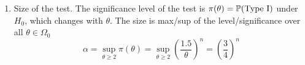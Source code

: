\documentclass[10pt, a4paper]{article}
\begin{document}
\begin{problem}
\begin{solution}
\begin{enumerate}[label = (\alph*)]
            Conversely,
            for $\theta > 1.5$,
            the probability of rejection is $\P(Y_n \leq 1.5) = \left(\frac{1.5}{\theta}\right) ^ n$ so
            \[
            \pi(\theta) = \begin{cases}
                1 & \theta \leq 1.5 \\
                \left(\frac{1.5}{\theta}\right) ^ n & \theta > 1.5.
            \end{cases}
            \]

            \item
            Size of the test.
            The significance level of the test is $\pi(\theta) = \P(\text{Type I})$ under $H_0$,
            which changes with $\theta$.
            The size is max/sup of the level/significance over all $\theta \in \Omega_0$
            \[
            \alpha = \sup_{\theta \geq 2}\pi(\theta) = \sup_{\theta \geq 2}\left(\frac{1.5}{\theta}\right) ^ n = \left(\frac{3}{4}\right) ^ n
            \]
        \end{enumerate}
    \end{solution}
\end{problem}
\end{document}
